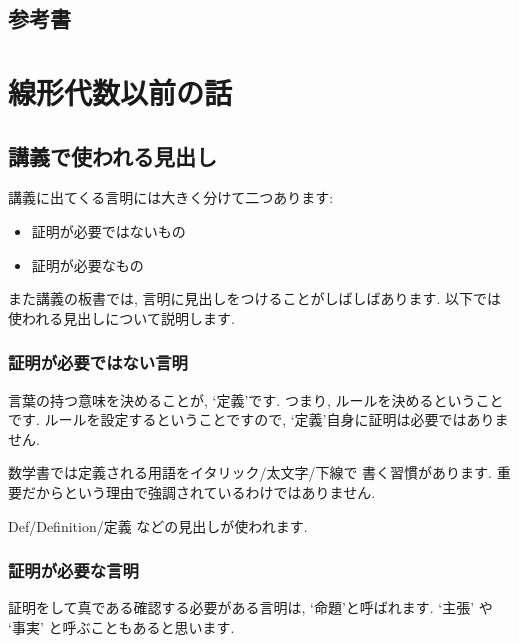 \section{参考書}


\tableofcontents

\chapter{線形代数以前の話}

\section{講義で使われる見出し}
講義に出てくる言明には大きく分けて二つあります:
\begin{itemize}
 \item 証明が必要ではないもの
 \item 証明が必要なもの
\end{itemize}
また講義の板書では,
言明に見出しをつけることがしばしばあります.
以下では使われる見出しについて説明します.
\subsection{証明が必要ではない言明}
言葉の持つ意味を決めることが,
`定義'です.
つまり, ルールを決めるということです.
ルールを設定するということですので,
`定義'自身に証明は必要ではありません.

数学書では定義される用語をイタリック/太文字/下線で
書く習慣があります.
重要だからという理由で強調されているわけではありません.

Def/Definition/定義 などの見出しが使われます.

\subsection{証明が必要な言明}
証明をして真である確認する必要がある言明は,
`命題'と呼ばれます.
`主張' や `事実' と呼ぶこともあると思います.

